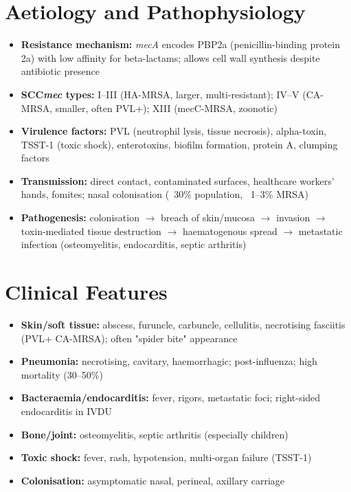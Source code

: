\section*{Aetiology and Pathophysiology}
\begin{itemize}
    \item \textbf{Resistance mechanism:} \textit{mecA} encodes PBP2a (penicillin-binding protein 2a) with low affinity for beta-lactams; allows cell wall synthesis despite antibiotic presence
    \item \textbf{SCC\textit{mec} types:} I--III (HA-MRSA, larger, multi-resistant); IV--V (CA-MRSA, smaller, often PVL+); XIII (mecC-MRSA, zoonotic)
    \item \textbf{Virulence factors:} PVL (neutrophil lysis, tissue necrosis), alpha-toxin, TSST-1 (toxic shock), enterotoxins, biofilm formation, protein A, clumping factors
    \item \textbf{Transmission:} direct contact, contaminated surfaces, healthcare workers' hands, fomites; nasal colonisation (~30\% population, ~1--3\% MRSA)
    \item \textbf{Pathogenesis:} colonisation $\to$ breach of skin/mucosa $\to$ invasion $\to$ toxin-mediated tissue destruction $\to$ haematogenous spread $\to$ metastatic infection (osteomyelitis, endocarditis, septic arthritis)
\end{itemize}

\section*{Clinical Features}
\begin{itemize}
    \item \textbf{Skin/soft tissue:} abscess, furuncle, carbuncle, cellulitis, necrotising fasciitis (PVL+ CA-MRSA); often "spider bite" appearance
    \item \textbf{Pneumonia:} necrotising, cavitary, haemorrhagic; post-influenza; high mortality (30--50\%)
    \item \textbf{Bacteraemia/endocarditis:} fever, rigors, metastatic foci; right-sided endocarditis in IVDU
    \item \textbf{Bone/joint:} osteomyelitis, septic arthritis (especially children)
    \item \textbf{Toxic shock:} fever, rash, hypotension, multi-organ failure (TSST-1)
    \item \textbf{Colonisation:} asymptomatic nasal, perineal, axillary carriage
\end{itemize}

